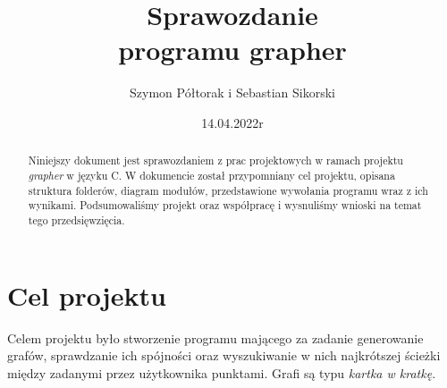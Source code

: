 \documentclass[10pt, a4paper]{report}
\title{\huge{\textbf{Sprawozdanie} \\ programu grapher}}
\author{Szymon Półtorak i Sebastian Sikorski}
\date{14.04.2022r}
\begin{document}
    \maketitle

    \renewcommand*\thesection{\arabic{section}}
    
    \begin{abstract}
        Niniejszy dokument jest sprawozdaniem z prac projektowych w ramach projektu \textit{grapher} w języku C.
        W dokumencie został przypomniany cel projektu, opisana struktura folderów, diagram modułów, przedstawione
        wywołania programu wraz z ich wynikami. Podsumowaliśmy projekt oraz współpracę i wysnuliśmy wnioski na temat tego przedsięwzięcia.
    \end{abstract}

    \pagestyle{fancy}
    \fancyhf{}
    
    \tableofcontents
    \newpage

    \section{Cel projektu}
    Celem projektu było stworzenie programu mającego za zadanie generowanie grafów, sprawdzanie ich spójności oraz wyszukiwanie w nich najkrótszej ścieżki między zadanymi przez użytkownika punktami. 
    Grafi są typu \textit{kartka w kratkę}.
\end{document}
